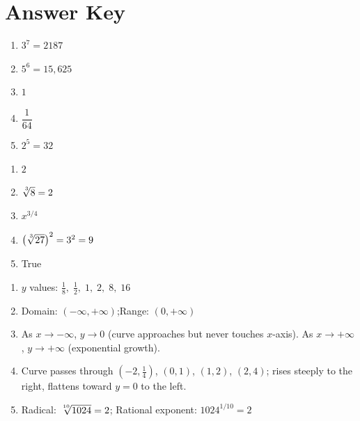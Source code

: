 \documentclass[12pt, letterpaper]{book}
\newcommand{\nthroot}[2]{\sqrt[\leftroot{-1}\uproot{2}#1]{#2}}
\begin{document}
\newpage
\section*{Answer Key}

\begin{answerbox}
\begin{enumerate}[label=\textbf{\arabic*.}, noitemsep]
  \item $3^7 = 2187$
  \item $5^6 = 15{,}625$
  \item $1$
  \item $\dfrac{1}{64}$
  \item $2^5 = 32$
\end{enumerate}
\end{answerbox}

\vspace{10pt}

\begin{answerbox}
\begin{enumerate}[label=\textbf{\arabic*.}, noitemsep, start=6]
  \item $2$
  \item $\nthroot{3}{8} = 2$
  \item $x^{3/4}$
  \item $\left(\nthroot{3}{27}\right)^2 = 3^2 = 9$
  \item True
\end{enumerate}
\end{answerbox}

\vspace{10pt}

\begin{answerbox}
\begin{enumerate}[label=\textbf{\arabic*.}, noitemsep, start=11]
  \item $y$ values: $\tfrac{1}{8},\; \tfrac{1}{2},\; 1,\; 2,\; 8,\; 16$
  \item Domain: $(-\infty,+\infty)$;\quad Range: $(0,+\infty)$
  \item As $x \to -\infty$, $y \to 0$ (curve approaches but never touches $x$-axis).
        As $x \to +\infty$, $y \to +\infty$ (exponential growth).
  \item Curve passes through $(-2,\tfrac{1}{4})$, $(0,1)$, $(1,2)$, $(2,4)$;
        rises steeply to the right, flattens toward $y=0$ to the left.
  \item Radical: $\nthroot{10}{1024} = 2$;\quad
        Rational exponent: $1024^{1/10} = 2$
\end{enumerate}
\end{answerbox}
\end{document}
